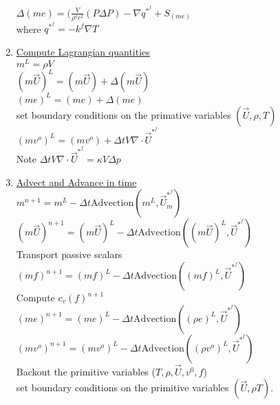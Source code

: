\documentclass[fleqn]{article}
\newcommand{\bigS}[1]   {\ensuremath{S_{#1}}  }
\newcommand{\U}         {{\vec{U}}}
\newcommand{\rhoM}      {\ensuremath{\rho^{o}}}
\newcommand{\delt}      {\ensuremath{\Delta{t}} }
\begin{document}
\begin{enumerate}
 $\Delta(me) =  
    (\frac{V} {\rhoM c^2}( P \Delta{P})
    - \nabla q^{*^f} 
    + \bigS{(m e)}$\\
where $q^{*^f} = -k^f \nabla T$
%
\item \underline{Compute Lagrangian quantities}\\
    $m^L     = {\rho}V$ \\
    $(m\U)^L = (m\U) + \Delta(m\U)$ \\
    $(m e)^L = (m e) + \Delta(m e)$ \\
    set boundary conditions on the primative variables $(\U, \rho, T)$
%
\newpage
{}\\
    $(mv^o)^L = (mv^o) + \delt V \nabla \cdot  \vec{U}^{*^{f}}$ \\
    Note $\delt V \nabla \cdot  \vec{U}^{*^{f}} = \kappa V \Delta{p}$
%
\item \underline{Advect and Advance in time}\\
$ m^{n+1}     = m^L 
                  - \delt\text{Advection}(m^L, \U_ m^{*^{f}})$ \\
$(m \U)^{n+1} = (m \U)^L 
                   - \delt\text{Advection}((m \U)^L, \vec{U}^{*^{f}})$\\
Transport passive scalars\\
$(m f)^{n+1} = (m f)^L 
                   - \delt\text{Advection}((m f)^L, \vec{U}^{*^{f}})$\\
Compute $c_v(f)^{n+1}$\\
$(me)^{n+1}   = (me)^L       
                   - \delt\text{Advection}((\rho  e)^L, \vec{U}^{*^{f}}) $\\
$(mv^o)^{n+1}   = (mv^o)^L       
                   - \delt\text{Advection}((\rho  v^o)^L, \vec{U}^{*^{f}})$ \\
Backout the primitive variables ($T, \rho, \U, v^0, f$)\\
set boundary conditions on the primitive variables $(\U, \rho T)$.
\end{enumerate}
\end{document}
